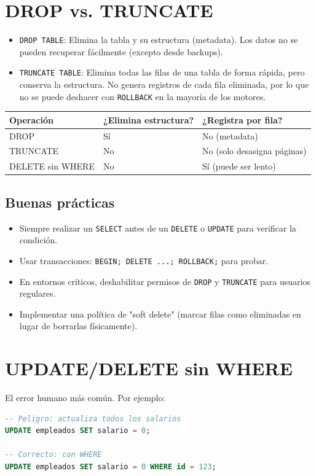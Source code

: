 \documentclass[12pt,a4paper,openany,oneside]{book}
\begin{document}
\section{DROP vs. TRUNCATE}
\begin{itemize}
    \item \texttt{DROP TABLE}: Elimina la tabla y su estructura (metadata). Los datos no se pueden recuperar fácilmente (excepto desde backups).
    \item \texttt{TRUNCATE TABLE}: Elimina todas las filas de una tabla de forma rápida, pero conserva la estructura. No genera registros de cada fila eliminada, por lo que no se puede deshacer con \texttt{ROLLBACK} en la mayoría de los motores.
\end{itemize}

\begin{center}
\begin{tabular}{|l|l|l|}
\hline
\textbf{Operación} & \textbf{¿Elimina estructura?} & \textbf{¿Registra por fila?} \\ \hline
DROP & Sí & No (metadata) \\
TRUNCATE & No & No (solo desasigna páginas) \\
DELETE sin WHERE & No & Sí (puede ser lento) \\ \hline
\end{tabular}
\end{center}

\subsection{Buenas prácticas}
\begin{itemize}
    \item Siempre realizar un \texttt{SELECT} antes de un \texttt{DELETE} o \texttt{UPDATE} para verificar la condición.
    \item Usar transacciones: \texttt{BEGIN; DELETE ...; ROLLBACK;} para probar.
    \item En entornos críticos, deshabilitar permisos de \texttt{DROP} y \texttt{TRUNCATE} para usuarios regulares.
    \item Implementar una política de "soft delete" (marcar filas como eliminadas en lugar de borrarlas físicamente).
\end{itemize}

\section{UPDATE/DELETE sin WHERE}
El error humano más común. Por ejemplo:
\begin{lstlisting}[language=SQL]
-- Peligro: actualiza todos los salarios
UPDATE empleados SET salario = 0;

-- Correcto: con WHERE
UPDATE empleados SET salario = 0 WHERE id = 123;
\end{lstlisting}
\end{document}
